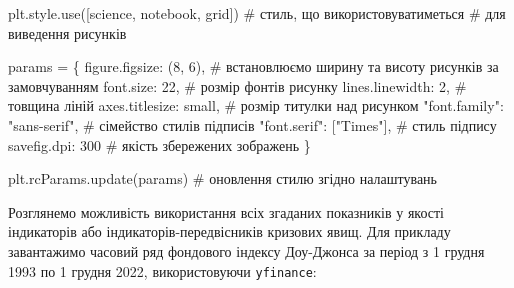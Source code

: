 \documentclass[
  letterpaper,
]{report}
\newenvironment{Shaded}{\begin{snugshade}}{\end{snugshade}}
\newcommand{\CommentTok}[1]{\textcolor[rgb]{0.37,0.37,0.37}{#1}}
\newcommand{\DecValTok}[1]{\textcolor[rgb]{0.68,0.00,0.00}{#1}}
\newcommand{\NormalTok}[1]{\textcolor[rgb]{0.00,0.23,0.31}{#1}}
\newcommand{\OperatorTok}[1]{\textcolor[rgb]{0.37,0.37,0.37}{#1}}
\newcommand{\StringTok}[1]{\textcolor[rgb]{0.13,0.47,0.30}{#1}}
\begin{document}
\begin{Shaded}
\begin{Highlighting}[]
\NormalTok{plt.style.use([}\StringTok{\textquotesingle{}science\textquotesingle{}}\NormalTok{, }\StringTok{\textquotesingle{}notebook\textquotesingle{}}\NormalTok{, }\StringTok{\textquotesingle{}grid\textquotesingle{}}\NormalTok{]) }\CommentTok{\# стиль, що використовуватиметься}
                                               \CommentTok{\# для виведення рисунків}

\NormalTok{params }\OperatorTok{=}\NormalTok{ \{}
    \StringTok{\textquotesingle{}figure.figsize\textquotesingle{}}\NormalTok{: (}\DecValTok{8}\NormalTok{, }\DecValTok{6}\NormalTok{),         }\CommentTok{\# встановлюємо ширину та висоту рисунків за замовчуванням}
    \StringTok{\textquotesingle{}font.size\textquotesingle{}}\NormalTok{: }\DecValTok{22}\NormalTok{,                  }\CommentTok{\# розмір фонтів рисунку}
    \StringTok{\textquotesingle{}lines.linewidth\textquotesingle{}}\NormalTok{: }\DecValTok{2}\NormalTok{,             }\CommentTok{\# товщина ліній}
    \StringTok{\textquotesingle{}axes.titlesize\textquotesingle{}}\NormalTok{: }\StringTok{\textquotesingle{}small\textquotesingle{}}\NormalTok{,        }\CommentTok{\# розмір титулки над рисунком}
    \StringTok{"font.family"}\NormalTok{: }\StringTok{"sans{-}serif"}\NormalTok{,      }\CommentTok{\# сімейство стилів підписів }
    \StringTok{"font.serif"}\NormalTok{: [}\StringTok{"Times"}\NormalTok{],          }\CommentTok{\# стиль підпису}
    \StringTok{\textquotesingle{}savefig.dpi\textquotesingle{}}\NormalTok{: }\DecValTok{300}                \CommentTok{\# якість збережених зображень}
\NormalTok{\}}

\NormalTok{plt.rcParams.update(params)           }\CommentTok{\# оновлення стилю згідно налаштувань}
\end{Highlighting}
\end{Shaded}

Розглянемо можливість використання всіх згаданих показників у якості
індикаторів або індикаторів-передвісників кризових явищ. Для прикладу
завантажимо часовий ряд фондового індексу Доу-Джонса за період з 1
грудня 1993 по 1 грудня 2022, використовуючи \texttt{yfinance}:
\end{document}
